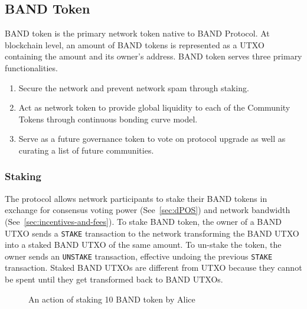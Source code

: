 \documentclass[letterpaper,11pt]{article}
\begin{document}
\subsection{BAND Token}
BAND token is the primary network token native to BAND Protocol. At blockchain level, an amount of BAND tokens is represented as a UTXO containing the amount and its owner's address. BAND token serves three primary functionalities.
\begin{enumerate}
\setlength\itemsep{0em}
\item Secure the network and prevent network spam through staking.
\item Act as network token to provide global liquidity to each of the Community Tokens through continuous bonding curve model.
\item Serve as a future governance token to vote on protocol upgrade as well as curating a list of future communities.
\end{enumerate}

\subsubsection{Staking}
The protocol allows network participants to stake their BAND tokens in exchange for consensus voting power (See~\cref{sec:dPOS}) and network bandwidth (See~\cref{sec:incentives-and-fees}). To stake BAND token, the owner of a BAND UTXO sends a {\tt STAKE} transaction to the network transforming the BAND UTXO into a staked BAND UTXO of the same amount. To un-stake the token, the owner sends an {\tt UNSTAKE} transaction, effective undoing the previous {\tt STAKE} transaction. Staked BAND UTXOs are different from UTXO because they cannot be spent until they get transformed back to BAND UTXOs.

\begin{figure}[!h]
\centering
{}
\caption{An action of staking 10 BAND token by Alice}
\label{fig:utxo-stake}
\end{figure}
\end{document}
